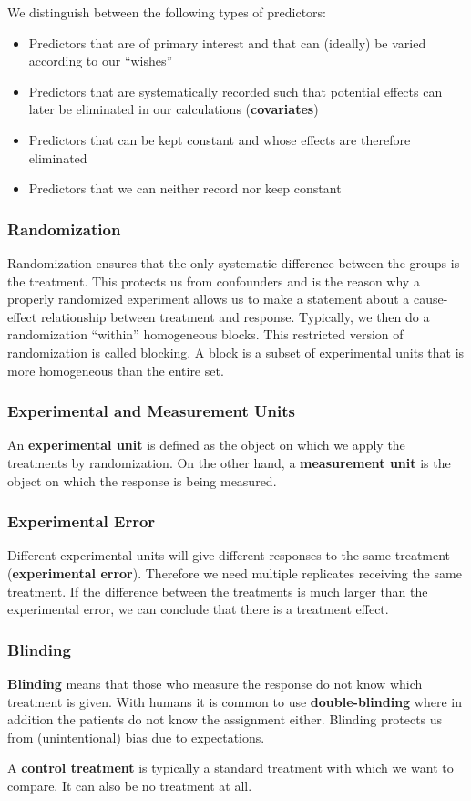 We distinguish between the following types of predictors:

\begin{itemize}
	\item Predictors that are of primary interest and that can (ideally) be varied according to our “wishes”
	\item Predictors that are systematically recorded such that potential effects can later be eliminated in our calculations (\textbf{covariates})
	\item Predictors that can be kept constant and whose effects are therefore eliminated
	\item Predictors that we can neither record nor keep constant
\end{itemize}

\subsubsection{Randomization}

Randomization ensures that the only systematic difference between the groups is the treatment. This protects us from confounders and is the reason why a properly randomized experiment allows us to make a statement about a cause-effect relationship between treatment and response. Typically, we then do a randomization “within” homogeneous blocks. This restricted version of randomization is called blocking. A block is a subset of experimental units that is more homogeneous than the entire set.

\subsubsection{Experimental and Measurement Units}

An \textbf{experimental unit} is defined as the object on which we apply the treatments by randomization. On the other hand, a \textbf{measurement unit} is the object on which the response is being measured.

\subsubsection{Experimental Error}

Different experimental units will give different responses to the same treatment (\textbf{experimental error}). Therefore we need multiple replicates receiving the same treatment. If the difference between the treatments is much larger than the experimental error, we can conclude that there is a treatment effect.

\subsubsection{Blinding}

\textbf{Blinding} means that those who measure the response do not know which treatment is given. With humans it is common to use \textbf{double-blinding} where in addition the patients do not know the assignment either. Blinding protects us from (unintentional) bias due to expectations.

A \textbf{control treatment} is typically a standard treatment with which we want to compare. It can also be no treatment at all.